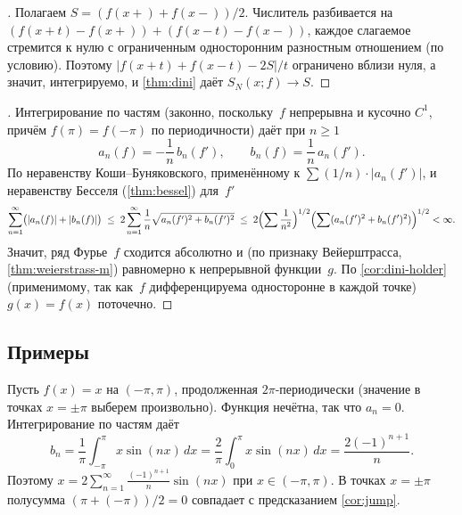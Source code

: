 \begin{proof}[]
Полагаем $S = (f(x+) + f(x-))/2$. Числитель разбивается на
$(f(x+t) - f(x+)) + (f(x-t) - f(x-))$, каждое слагаемое стремится к
нулю с ограниченным односторонним разностным отношением (по условию).
Поэтому $|f(x+t) + f(x-t) - 2S|/t$ ограничено вблизи нуля, а значит,
интегрируемо, и \cref{thm:dini} даёт $S_N(x; f) \to S$.
\end{proof}

\begin{proof}[]
Интегрирование по частям (законно, поскольку~$f$ непрерывна и
кусочно $C^1$, причём $f(\pi) = f(-\pi)$ по периодичности) даёт при
$n \ge 1$
\[
  a_n(f) = -\frac{1}{n}\, b_n(f'), \qquad b_n(f) = \frac{1}{n}\, a_n(f').
\]
По неравенству Коши--Буняковского, применённому к
$\sum (1/n) \cdot |a_n(f')|$, и неравенству Бесселя
(\cref{thm:bessel}) для~$f'$
\[
  \sum_{n=1}^{\infty} \bigl(|a_n(f)| + |b_n(f)|\bigr)
  \;\le\; 2 \sum_{n=1}^{\infty} \frac{1}{n} \sqrt{a_n(f')^2 + b_n(f')^2}
  \;\le\; 2 \Bigl(\sum \frac{1}{n^2}\Bigr)^{1/2} \Bigl(\sum (a_n(f')^2 + b_n(f')^2)\Bigr)^{1/2} < \infty.
\]
Значит, ряд Фурье~$f$ сходится абсолютно и (по признаку Вейерштрасса,
\cref{thm:weierstrass-m}) равномерно к непрерывной функции~$g$. По
\cref{cor:dini-holder} (применимому, так как~$f$ дифференцируема
односторонне в каждой точке) $g(x) = f(x)$ поточечно.
\end{proof}

\subsection*{Примеры}

\begin{example}
\label{ex:sawtooth}
Пусть $f(x) = x$ на $(-\pi, \pi)$, продолженная $2\pi$-периодически
(значение в точках $x = \pm\pi$ выберем произвольно). Функция
нечётна, так что $a_n = 0$. Интегрирование по частям даёт
\[
  b_n = \frac{1}{\pi} \int_{-\pi}^{\pi} x \sin(nx)\, dx
       = \frac{2}{\pi} \int_{0}^{\pi} x \sin(nx)\, dx
       = \frac{2 (-1)^{n+1}}{n}.
\]
Поэтому
$x = 2 \sum_{n=1}^{\infty} \frac{(-1)^{n+1}}{n} \sin(nx)$ при
$x \in (-\pi, \pi)$. В точках $x = \pm\pi$ полусумма
$(\pi + (-\pi))/2 = 0$ совпадает с предсказанием \cref{cor:jump}.
\end{example}

